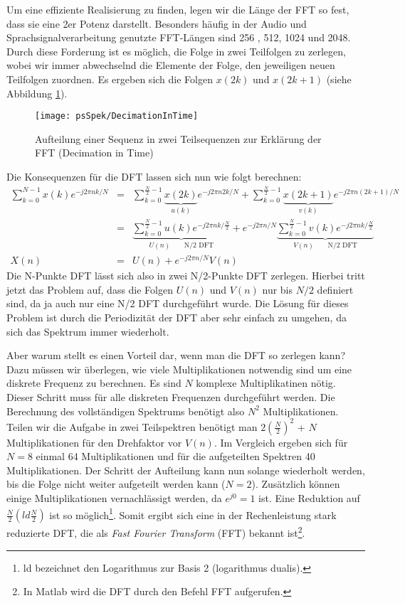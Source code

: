 Um eine effiziente Realisierung zu finden, legen wir die Länge der
FFT so fest, dass sie eine 2er Potenz darstellt. Besonders häufig in der
Audio und Sprachsignalverarbeitung
genutzte FFT-Längen sind 256 , 512, 1024 und 2048.
Durch diese Forderung ist es möglich, die Folge in zwei Teilfolgen zu zerlegen, wobei
wir immer abwechselnd die Elemente der Folge, den jeweiligen neuen Teilfolgen zuordnen.
Es ergeben sich die Folgen $x(2k)$ und $x(2k+1)$ (siehe Abbildung \ref{pic:DecimationInTime}).

\begin{figure}[H]
\begin{center}
\texttt{[image: psSpek/DecimationInTime]}
\caption{\label{pic:DecimationInTime}Aufteilung einer Sequenz in zwei Teilsequenzen zur
Erklärung der FFT (Decimation in Time)}
\end{center}
\end{figure}

Die Konsequenzen für die DFT lassen sich nun wie folgt berechnen:
\begin{eqnarray} \nonumber
\sum_{k = 0}^{N-1} x(k) e^{-j 2 \pi n k /N} & = &
\sum_{k = 0}^{\frac{N}{2}-1} \underbrace{x(2k)}_{u(k)} e^{-j 2 \pi n 2k /N} +
\sum_{k = 0}^{\frac{N}{2}-1} \underbrace{x(2k+1)}_{v(k)} e^{-j 2 \pi n (2k+1) /N} \\\nonumber
& = & \underbrace{\sum_{k = 0}^{\frac{N}{2}-1}u(k) e^{-j 2 \pi n k /\frac{N}{2}}}_{U(n) \qquad \mbox {N/2 DFT}} +
e^{-j2\pi n /N} \underbrace{\sum_{k = 0}^{\frac{N}{2}-1}
v(k) e^{-j 2 \pi n k /\frac{N}{2}}}_{V(n) \qquad \mbox {N/2 DFT}}\\
X(n) & = & U(n) + e^{-j2\pi n /N} V(n)
\end{eqnarray}
Die N-Punkte DFT lässt sich also in zwei N/2-Punkte DFT zerlegen. Hierbei tritt jetzt das Problem auf,
dass die Folgen $U(n)$ und $V(n)$ nur bis $N/2$ definiert sind, da ja auch nur eine N/2 DFT durchgeführt wurde.
Die Lösung für dieses Problem ist durch die Periodizität der DFT aber sehr einfach zu umgehen, da sich das
Spektrum immer wiederholt.

Aber warum stellt es einen Vorteil dar, wenn man die DFT so zerlegen kann? Dazu müssen wir überlegen,
wie viele Multiplikationen notwendig sind um eine diskrete Frequenz zu berechnen. Es sind
$N$ komplexe Multiplikatinen nötig. Dieser Schritt muss für alle diskreten Frequenzen durchgeführt werden.
Die Berechnung des vollständigen Spektrums benötigt also $N^2$ Multiplikationen. Teilen wir die
Aufgabe in zwei Teilspektren benötigt man $2\left(\frac{N}{2}\right)^2$ + $N$ Multiplikationen für
den Drehfaktor vor $V(n)$. Im Vergleich ergeben sich \zB für $N = 8$ einmal 64 Multiplikationen
und für die aufgeteilten Spektren 40 Multiplikationen. Der Schritt der Aufteilung kann nun solange
wiederholt werden, bis die Folge nicht weiter aufgeteilt werden kann ($N = 2$). Zusätzlich
können einige Multiplikationen vernachlässigt werden, da $e^{j0} = 1$ ist. Eine
Reduktion auf $\frac{N}{2}\left( ld \frac{N}{2} \right)$ ist so möglich\footnote{ld bezeichnet den
Logarithmus zur Basis 2 (logarithmus dualis). }. Somit ergibt sich eine in der Rechenleistung
stark reduzierte DFT, die als {\em Fast Fourier Transform} (FFT) bekannt ist\footnote{In Matlab wird
die DFT durch den Befehl FFT aufgerufen.}.

